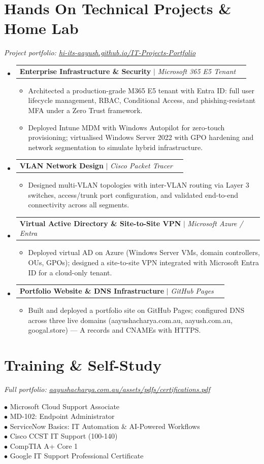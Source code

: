 \documentclass[letterpaper,11pt]{article}
\makeatletter
\newcommand{\resumeItem}[1]{
  \item\small{#1 \vspace{-2pt}}
}
\newcommand{\resumeProjectHeading}[2]{
    \item
    \begin{tabular*}{0.97\textwidth}{l@{\extracolsep{\fill}}r}
      \small#1 & #2 \\
    \end{tabular*}\vspace{-7pt}
}
\newcommand{\resumeSubHeadingListStart}{\begin{itemize}[leftmargin=0.15in, label={}]}
\newcommand{\resumeSubHeadingListEnd}{\end{itemize}}
\newcommand{\resumeItemListStart}{\begin{itemize}}
\newcommand{\resumeItemListEnd}{\end{itemize}\vspace{-5pt}}
\makeatother
\begin{document}
\section{Hands On Technical Projects \& Home Lab}
\textit{Project portfolio: \href{https://hi-its-aayush.github.io/IT-Projects-Portfolio/}{hi-its-aayush.github.io/IT-Projects-Portfolio}}
    \resumeSubHeadingListStart
      \resumeProjectHeading
          {\textbf{Enterprise Infrastructure \& Security} $|$ \emph{Microsoft 365 E5 Tenant}}{}
          \resumeItemListStart
            \resumeItem{Architected a production-grade M365 E5 tenant with Entra ID: full user lifecycle management, RBAC, Conditional Access, and phishing-resistant MFA under a Zero Trust framework.}
            \resumeItem{Deployed Intune MDM with Windows Autopilot for zero-touch provisioning; virtualised Windows Server 2022 with GPO hardening and network segmentation to simulate hybrid infrastructure.}
          \resumeItemListEnd
      \resumeProjectHeading
          {\textbf{VLAN Network Design} $|$ \emph{Cisco Packet Tracer}}{}
          \resumeItemListStart
            \resumeItem{Designed multi-VLAN topologies with inter-VLAN routing via Layer 3 switches, access/trunk port configuration, and validated end-to-end connectivity across all segments.}
          \resumeItemListEnd
      \resumeProjectHeading
          {\textbf{Virtual Active Directory \& Site-to-Site VPN} $|$ \emph{Microsoft Azure / Entra}}{}
          \resumeItemListStart
            \resumeItem{Deployed virtual AD on Azure (Windows Server VMs, domain controllers, OUs, GPOs); designed a site-to-site VPN integrated with Microsoft Entra ID for a cloud-only tenant.}
          \resumeItemListEnd
      \resumeProjectHeading
          {\textbf{Portfolio Website \& DNS Infrastructure} $|$ \emph{GitHub Pages}}{}
          \resumeItemListStart
            \resumeItem{Built and deployed a portfolio site on GitHub Pages; configured DNS across three live domains (aayushacharya.com.au, aayush.com.au, googal.store) --- A records and CNAMEs with HTTPS.}
          \resumeItemListEnd
    \resumeSubHeadingListEnd

\section{Training \& Self-Study}
\textit{Full portfolio: \href{http://aayushacharya.com.au/assets/pdfs/certifications.pdf}{aayushacharya.com.au/assets/pdfs/certifications.pdf}}
\vspace{4pt}
 \begin{itemize}[leftmargin=0.15in, label={}]
    \small{\item{
      $\bullet$ Microsoft Cloud Support Associate \\
      $\bullet$ MD-102: Endpoint Administrator \\
      $\bullet$ ServiceNow Basics: IT Automation \& AI-Powered Workflows \\
      $\bullet$ Cisco CCST IT Support (100-140) \\
      $\bullet$ CompTIA A+ Core 1 \\
      $\bullet$ Google IT Support Professional Certificate
    }}
 \end{itemize}
\end{document}
